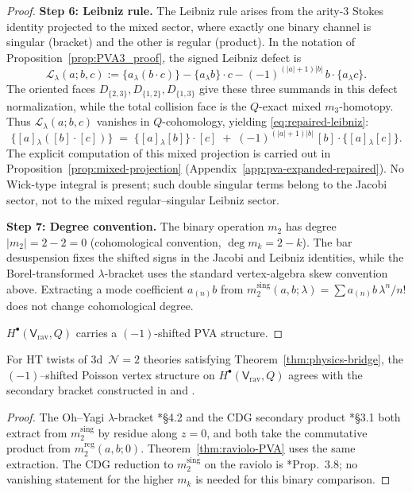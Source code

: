 \begin{proof}
\medskip\noindent\textbf{Step 6: Leibniz rule.}
The Leibniz rule arises from the arity-\(3\) Stokes identity projected
to the mixed sector, where exactly one binary channel is singular
(bracket) and the other is regular (product).  In the notation of
Proposition~\ref{prop:PVA3_proof}, the signed Leibniz defect is
\[
\mathcal L_\lambda(a;b,c)
:=
\{a{}_\lambda(b\cdot c)\}
-
\{a{}_\lambda b\}\cdot c
-
(-1)^{(|a|+1)|b|}\,b\cdot\{a{}_\lambda c\}.
\]
The oriented faces \(D_{\{2,3\}},D_{\{1,2\}},D_{\{1,3\}}\) give these
three summands in this defect normalization, while the total collision
face is the \(Q\)-exact mixed \(m_3\)-homotopy.  Thus
\(\mathcal L_\lambda(a;b,c)\) vanishes in \(Q\)-cohomology, yielding
\eqref{eq:repaired-leibniz}:
\[
 \{[a]{}_\lambda ([b]\cdot [c])\}
 \;=\; \{[a]{}_\lambda [b]\}\cdot [c]
 \;+\; (-1)^{(|a|+1)|b|}\,[b]\cdot\{[a]{}_\lambda [c]\}.
\]
The explicit computation of this mixed projection is carried out in
Proposition~\ref{prop:mixed-projection} (Appendix~\ref{app:pva-expanded-repaired}).
No Wick-type integral is present; such double singular terms belong to
the Jacobi sector, not to the mixed regular--singular Leibniz sector.

\medskip\noindent\textbf{Step 7: Degree convention.}
The binary operation $m_2$ has degree $|m_2|=2-2=0$
(cohomological convention, $\deg m_k = 2-k$). The bar
desuspension fixes the shifted signs in the Jacobi and Leibniz
identities, while the Borel-transformed $\lambda$-bracket uses the
standard vertex-algebra skew convention above. Extracting a mode
coefficient $a_{(n)}b$ from
$m_2^{\mathrm{sing}}(a,b;\lambda)=\sum a_{(n)}b\,\lambda^n/n!$
does not change cohomological degree.

\medskip
$H^\bullet(\mathsf{V}_{\mathrm{rav}}, Q)$ carries a $(-1)$-shifted PVA structure.
\end{proof}

\begin{corollary}
\label{cor:compatibility-OY-CDG}
For HT twists of $3$d~$\mathcal N=2$ theories satisfying Theorem~\ref{thm:physics-bridge},
the $(-1)$–shifted Poisson vertex structure on $H^\bullet(\mathsf V_{\mathrm{rav}},Q)$
agrees with the secondary bracket constructed in
\cite{OY20} and \cite{CDG20}.
\end{corollary}

\begin{proof}
The Oh--Yagi $\lambda$-bracket \cite{OY20}*{\S4.2} and the CDG
secondary product \cite{CDG20}*{\S3.1} both extract from
$m_2^{\mathrm{sing}}$ by residue along $z = 0$, and both take the
commutative product from $m_2^{\mathrm{reg}}(a,b;0)$.
Theorem~\ref{thm:raviolo-PVA} uses the same extraction.
The CDG reduction to $m_2^{\mathrm{sing}}$ on the raviolo is
\cite{CDG20}*{Prop.~3.8};
no vanishing statement for the higher $m_k$ is needed for this
binary comparison.
\end{proof}

